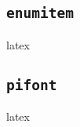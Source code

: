 \documentclass{report}
\begin{document}
\subsection{\texttt{enumitem}}
\begin{imtaCode}{latex}
\RequirePackage{enumitem}
\end{imtaCode}

\subsection{\texttt{pifont}}
\begin{imtaCode}{latex}
    \RequirePackage{pifont}
\end{imtaCode}




\end{document}
